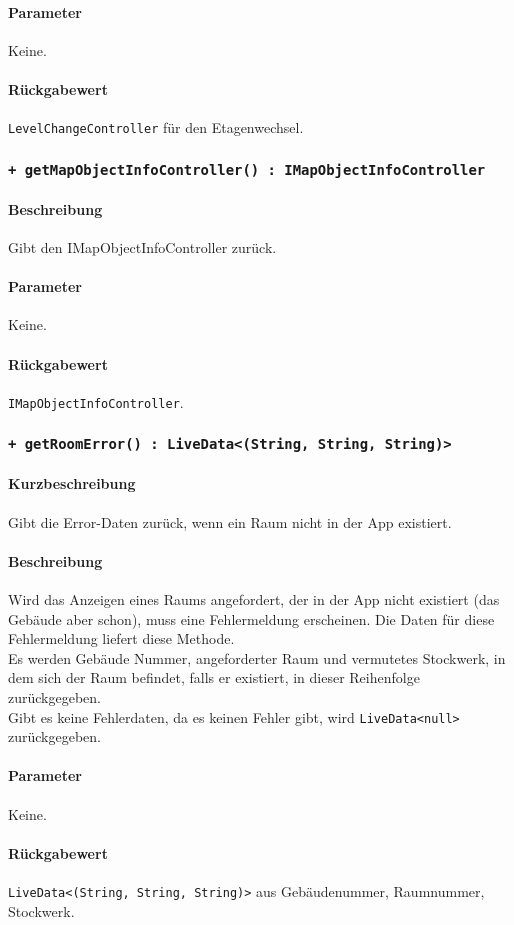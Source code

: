 \paragraph*{Parameter}
Keine.
\paragraph*{Rückgabewert}
\texttt{LevelChangeController} für den Etagenwechsel.

\subsubsection*{\texttt{+ getMapObjectInfoController() : IMapObjectInfoController}}%
\paragraph*{Beschreibung}
Gibt den IMapObjectInfoController zurück.
\paragraph*{Parameter}
Keine.
\paragraph*{Rückgabewert}
\texttt{IMapObjectInfoController}.

\subsubsection*{\texttt{+ getRoomError() : LiveData<(String, String, String)>}}%
\paragraph*{Kurzbeschreibung}
Gibt die Error-Daten zurück, wenn ein Raum nicht in der App existiert.
\paragraph*{Beschreibung}
Wird das Anzeigen eines Raums angefordert, der in der App nicht existiert (das Gebäude aber schon), 
muss eine Fehlermeldung erscheinen. Die Daten für diese Fehlermeldung liefert diese Methode.\\
Es werden Gebäude Nummer, angeforderter Raum und vermutetes Stockwerk, in dem sich der Raum befindet, 
falls er existiert, in dieser Reihenfolge zurückgegeben.\\
Gibt es keine Fehlerdaten, da es keinen Fehler gibt, wird \texttt{LiveData<null>} zurückgegeben.
\paragraph*{Parameter}
Keine.
\paragraph*{Rückgabewert}
\texttt{LiveData<(String, String, String)>} aus Gebäudenummer, Raumnummer, Stockwerk.
